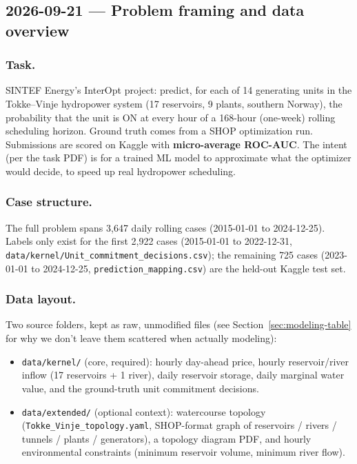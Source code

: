 \subsection{2026-09-21 --- Problem framing and data overview}

\subsubsection*{Task.} SINTEF Energy's InterOpt project: predict, for each of 14 generating units in
the Tokke--Vinje hydropower system (17 reservoirs, 9 plants, southern Norway), the probability
that the unit is ON at every hour of a 168-hour (one-week) rolling scheduling horizon. Ground
truth comes from a SHOP optimization run. Submissions are scored on Kaggle with
\textbf{micro-average ROC-AUC}. The intent (per the task PDF) is for a trained ML model to
approximate what the optimizer would decide, to speed up real hydropower scheduling.

\subsubsection*{Case structure.} The full problem spans 3{,}647 daily rolling cases
(2015-01-01 to 2024-12-25). Labels only exist for the first 2{,}922 cases
(2015-01-01 to 2022-12-31, \texttt{data/kernel/Unit\_commitment\_decisions.csv}); the remaining
725 cases (2023-01-01 to 2024-12-25, \texttt{prediction\_mapping.csv}) are the held-out Kaggle
test set.

\subsubsection*{Data layout.} Two source folders, kept as raw, unmodified files (see
Section~\ref{sec:modeling-table} for why we don't leave them scattered when actually modeling):

\begin{itemize}
  \item \texttt{data/kernel/} (core, required): hourly day-ahead price, hourly reservoir/river
    inflow (17 reservoirs + 1 river), daily reservoir storage, daily marginal water value,
    and the ground-truth unit commitment decisions.
  \item \texttt{data/extended/} (optional context): watercourse topology
    (\texttt{Tokke\_Vinje\_topology.yaml}, SHOP-format graph of reservoirs / rivers / tunnels /
    plants / generators), a topology diagram PDF, and hourly environmental constraints (minimum
    reservoir volume, minimum river flow).
\end{itemize}


